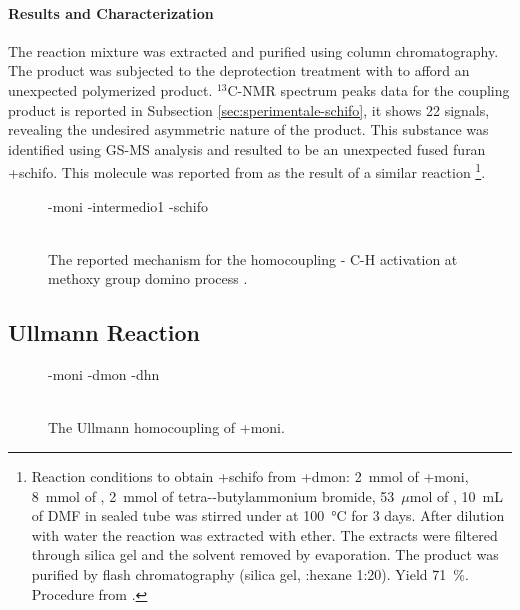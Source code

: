   \paragraph{Results and Characterization}
    The reaction mixture was extracted and purified using column chromatography. The product was subjected to the deprotection treatment with  to afford an unexpected polymerized product. $^{13}$C-NMR spectrum peaks data for the coupling product is reported in Subsection \ref{sec:sperimentale-schifo}, it shows 22 signals, revealing the undesired asymmetric nature of the product. This substance was identified using GS-MS analysis and resulted to be an unexpected fused furan \cmpd+{schifo}. This molecule was reported from \citet{Dyker1994} as the result of a similar reaction
\footnote{Reaction conditions to obtain \cmpd+{schifo} from \cmpd+{dmon}: 2~mmol of \cmpd+{moni}, 8~mmol of , 2~mmol of tetra-\n-butylammonium bromide, 53~$\mu$mol of , 10~mL of DMF in sealed tube was stirred under  at \SI{100}{\celsius} for 3 days. After dilution with water the reaction was extracted with ether. The extracts were filtered through silica gel and the solvent removed by evaporation. The product was purified by flash chromatography (silica gel, :hexane 1:20). Yield 71~\%. Procedure from \citet{Dyker1994}.}.
  
  \begin{figure}
    \cmpdref-{moni}
    \cmpdref-{intermedio1}
    \cmpdref-{schifo}
  \caption{\\ The reported mechanism for the homo\-coupling - C-H activation at methoxy group domino process \cite{Dyker1994}.\label{sc:formazione-schifo}}
  \end{figure}

\subsection{Ullmann Reaction}
  \begin{figure}
    \cmpdref-{moni}
    \cmpdref-{dmon}
    \cmpdref-{dhn}
  \caption{\\ The Ullmann homo\-coupling of \cmpd+{moni}.\label{sc:moni-dhn}}
  \end{figure}

